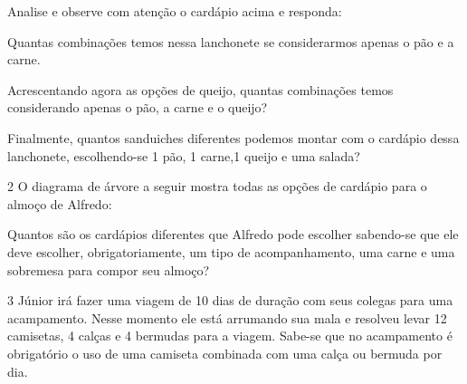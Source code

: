 Analise e observe com atenção o cardápio acima e responda:

\begin{escolha}
\item
  Quantas combinações temos nessa lanchonete se considerarmos apenas o
  pão e a carne.


\item
  Acrescentando agora as opções de queijo, quantas combinações temos
  considerando apenas o pão, a carne e o queijo?


\item
  Finalmente, quantos sanduiches diferentes podemos montar com o
  cardápio dessa lanchonete, escolhendo-se 1 pão, 1 carne,1 queijo e uma
  salada?

\end{escolha}


\num{2} O diagrama de árvore a seguir mostra todas as opções de cardápio
para o almoço de Alfredo:


Quantos são os cardápios diferentes que Alfredo pode escolher sabendo-se
que ele deve escolher, obrigatoriamente, um tipo de acompanhamento, uma
carne e uma sobremesa para compor seu almoço?



\num{3} Júnior irá fazer uma viagem de 10 dias de duração com seus colegas
para uma acampamento. Nesse momento ele está arrumando sua mala e
resolveu levar 12 camisetas, 4 calças e 4 bermudas para a viagem.
Sabe-se que no acampamento é obrigatório o uso de uma camiseta combinada
com uma calça ou bermuda por dia.


